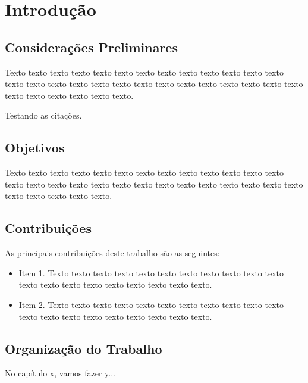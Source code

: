\chapter{Introdução}
\label{cap:introducao}

\section{Considerações Preliminares}
\label{sec:consideracoes_preliminares}

Texto texto texto texto texto texto texto texto texto texto texto texto texto
texto texto texto texto texto texto texto texto texto texto texto texto texto
texto texto texto texto texto texto texto.

Testando as citações.
\cite{fellerv1}
\cite{fellerv2}
\cite{fontes:08}
\cite{reuter:69}
\cite{kendall:56}

 

\section{Objetivos}
\label{sec:objetivo}

Texto texto texto texto texto texto texto texto texto texto texto texto texto
texto texto texto texto texto texto texto texto texto texto texto texto texto
texto texto texto texto texto texto.

\section{Contribuições}
\label{sec:contribucoes}

As principais contribuições deste trabalho são as seguintes:

\begin{itemize}
  \item Item 1. Texto texto texto texto texto texto texto texto texto texto
  texto texto texto texto texto texto texto texto texto texto.

  \item Item 2. Texto texto texto texto texto texto texto texto texto texto
  texto texto texto texto texto texto texto texto texto texto.

\end{itemize}

\section{Organização do Trabalho}
\label{sec:organizacao_trabalho}

No capítulo x, vamos fazer y...


